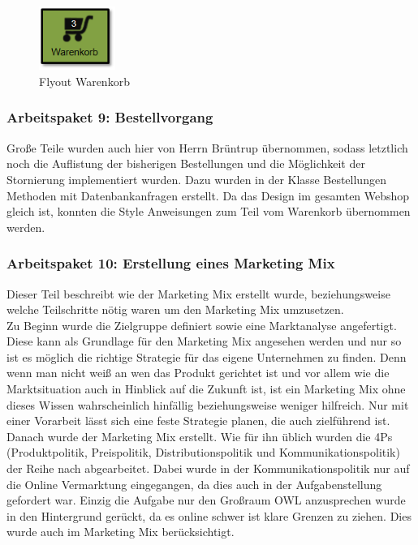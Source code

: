 \begin{figure}[H]
	\begin{center}
			\includegraphics[width=25mm]{Bilder/Warenkorb_symbol.png}
	\end{center}
	\caption{Flyout Warenkorb}
\end{figure}

\subsubsection{Arbeitspaket 9: Bestellvorgang}
Große Teile wurden auch hier von Herrn Brüntrup übernommen, sodass letztlich noch die Auflistung der bisherigen Bestellungen und die Möglichkeit der Stornierung implementiert wurden. Dazu wurden in der Klasse Bestellungen Methoden mit Datenbankanfragen erstellt. Da das Design im gesamten Webshop gleich ist, konnten die Style Anweisungen zum Teil vom Warenkorb übernommen werden.

\subsubsection{Arbeitspaket 10: Erstellung eines Marketing Mix}
Dieser Teil beschreibt wie der Marketing Mix erstellt wurde, beziehungsweise welche Teilschritte nötig waren um den Marketing Mix umzusetzen.\\
Zu Beginn wurde die Zielgruppe definiert sowie eine Marktanalyse angefertigt. Diese kann als Grundlage für den Marketing Mix angesehen werden und nur so ist es möglich die richtige Strategie für das eigene Unternehmen zu finden. Denn wenn man nicht weiß an wen das Produkt gerichtet ist und vor allem wie die Marktsituation auch in Hinblick auf die Zukunft ist, ist ein Marketing Mix ohne dieses Wissen wahrscheinlich hinfällig beziehungsweise weniger hilfreich. Nur mit einer Vorarbeit lässt sich eine feste Strategie planen, die auch zielführend ist.\\
Danach wurde der Marketing Mix erstellt. Wie für ihn üblich wurden die 4Ps (Produktpolitik, Preispolitik, Distributionspolitik und Kommunikationspolitik) der Reihe nach abgearbeitet. Dabei wurde in der Kommunikationspolitik nur auf die Online Vermarktung eingegangen, da dies auch in der Aufgabenstellung gefordert war. Einzig die Aufgabe nur den Großraum OWL anzusprechen wurde in den Hintergrund gerückt, da es online schwer ist klare Grenzen zu ziehen. Dies wurde auch im Marketing Mix berücksichtigt. \\

